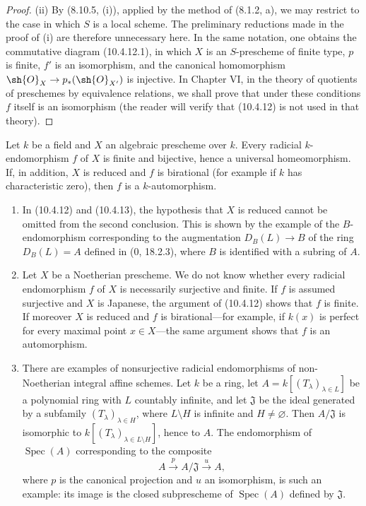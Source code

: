 \begin{proof}
\textup{(ii)} By (8.10.5, (i)), applied by the method of (8.1.2, a), we
may restrict to the case in which $S$ is a local scheme.  The preliminary
reductions made in the proof of (i) are therefore unnecessary here.  In
the same notation, one obtains the commutative diagram (10.4.12.1), in
which $X$ is an $S$-prescheme of finite type, $p$ is finite, $f'$ is an
isomorphism, and the canonical homomorphism
$\sh{O}_X\to p_*(\sh{O}_{X'})$ is injective.  In Chapter VI, in the
theory of quotients of preschemes by equivalence relations, we shall
prove that under these conditions $f$ itself is an isomorphism (the
reader will verify that (10.4.12) is not used in that theory).
\end{proof}

\begin{corollary}[10.4.13]
Let $k$ be a field and $X$ an algebraic prescheme over $k$.  Every
radicial $k$-endomorphism $f$ of $X$ is finite and bijective, hence a
universal homeomorphism.  If, in addition, $X$ is reduced and $f$ is
birational (for example if $k$ has characteristic zero), then $f$ is a
$k$-automorphism.
\end{corollary}

\begin{remark}[10.4.14]
\begin{enumerate}[label=\textup{(\roman*)}]
\item In (10.4.12) and (10.4.13), the hypothesis that $X$ is reduced
cannot be omitted from the second conclusion.  This is shown by the
example of the $B$-endomorphism corresponding to the augmentation
$D_B(L)\to B$ of the ring $D_B(L)=A$ defined in (0, 18.2.3), where $B$
is identified with a subring of $A$.

\item Let $X$ be a Noetherian prescheme.  We do not know whether every
radicial endomorphism $f$ of $X$ is necessarily surjective and finite.
If $f$ is assumed surjective and $X$ is Japanese, the argument of
(10.4.12) shows that $f$ is finite.  If moreover $X$ is reduced and
$f$ is birational---for example, if $k(x)$ is perfect for every maximal
point $x\in X$---the same argument shows that $f$ is an automorphism.

\item There are examples of nonsurjective radicial endomorphisms of
non-Noetherian integral affine schemes.  Let $k$ be a ring, let
$A=k[(T_\lambda)_{\lambda\in L}]$ be a polynomial ring with $L$
countably infinite, and let $\mathfrak J$ be the ideal generated by a
subfamily $(T_\lambda)_{\lambda\in H}$, where $L\setminus H$ is infinite
and $H\neq\varnothing$.  Then $A/\mathfrak J$ is isomorphic to
$k[(T_\lambda)_{\lambda\in L\setminus H}]$, hence to $A$.  The
endomorphism of $\operatorname{Spec}(A)$ corresponding to the composite
\[
 A\xrightarrow{p}A/\mathfrak J\xrightarrow{u}A,
\]
where $p$ is the canonical projection and $u$ an isomorphism, is such
an example: its image is the closed subprescheme of
$\operatorname{Spec}(A)$ defined by $\mathfrak J$.
\end{enumerate}
\end{remark}
